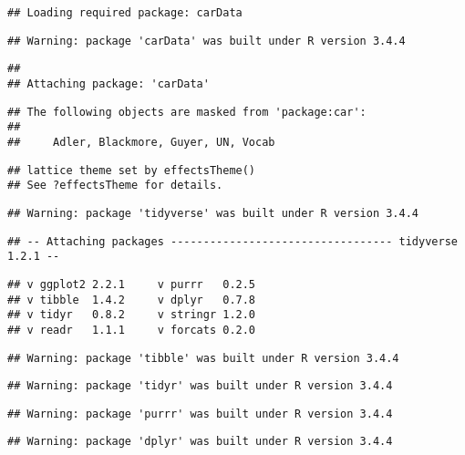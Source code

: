 \documentclass[]{article}
\begin{document}
\begin{verbatim}
## Loading required package: carData
\end{verbatim}

\begin{verbatim}
## Warning: package 'carData' was built under R version 3.4.4
\end{verbatim}

\begin{verbatim}
## 
## Attaching package: 'carData'
\end{verbatim}

\begin{verbatim}
## The following objects are masked from 'package:car':
## 
##     Adler, Blackmore, Guyer, UN, Vocab
\end{verbatim}

\begin{verbatim}
## lattice theme set by effectsTheme()
## See ?effectsTheme for details.
\end{verbatim}

\begin{verbatim}
## Warning: package 'tidyverse' was built under R version 3.4.4
\end{verbatim}

\begin{verbatim}
## -- Attaching packages ---------------------------------- tidyverse 1.2.1 --
\end{verbatim}

\begin{verbatim}
## v ggplot2 2.2.1     v purrr   0.2.5
## v tibble  1.4.2     v dplyr   0.7.8
## v tidyr   0.8.2     v stringr 1.2.0
## v readr   1.1.1     v forcats 0.2.0
\end{verbatim}

\begin{verbatim}
## Warning: package 'tibble' was built under R version 3.4.4
\end{verbatim}

\begin{verbatim}
## Warning: package 'tidyr' was built under R version 3.4.4
\end{verbatim}

\begin{verbatim}
## Warning: package 'purrr' was built under R version 3.4.4
\end{verbatim}

\begin{verbatim}
## Warning: package 'dplyr' was built under R version 3.4.4
\end{verbatim}
\end{document}
